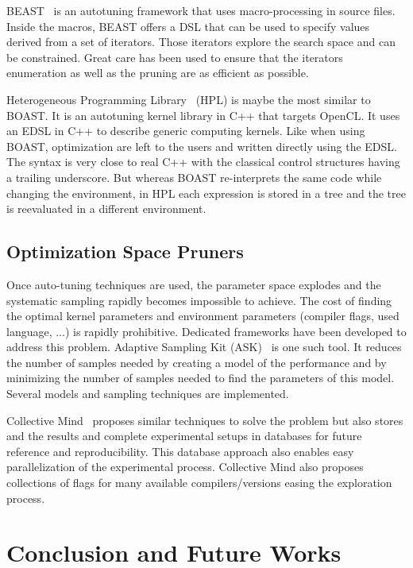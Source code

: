 \documentclass{IEEEtran}
\begin{document}
BEAST~\cite{CPE:CPE3516} is an autotuning framework that uses macro-processing
in source files. Inside the macros, BEAST offers a DSL that can be used to
specify values derived from a set of iterators. Those iterators explore the
search space and can be constrained. Great care has been used to ensure that
the iterators enumeration as well as the pruning are as efficient as possible.

Heterogeneous Programming Library~\cite{vinas2013exploiting} (HPL) is maybe
the most similar to BOAST. It is an autotuning kernel library in C++ that targets
OpenCL. It uses an EDSL in C++ to describe generic computing kernels. Like when
using BOAST, optimization are left to the users and written directly using the
EDSL. The syntax is very close to real C++ with the classical control
structures having a trailing underscore. But whereas BOAST re-interprets the
same code while changing the environment, in HPL each expression is stored in a
tree and the tree is reevaluated in a different environment.

\subsection{Optimization Space Pruners}

Once auto-tuning techniques are used, the parameter space explodes and the
systematic sampling rapidly becomes impossible to achieve. The cost of finding
the optimal kernel parameters and environment parameters (compiler flags, used
language, ...) is rapidly prohibitive. Dedicated frameworks have been developed
to address this problem. Adaptive Sampling Kit (ASK)~\cite{castro2013adaptive}
is one such tool. It reduces the number of samples needed by creating a model of
the performance and by minimizing the number of samples needed to find the
parameters of this model. Several models and sampling techniques are
implemented.

Collective Mind~\cite{fursin:hal-01054763} proposes similar techniques to
solve the problem but also stores and the results and complete experimental
setups in databases for future reference and reproducibility. This database
approach also enables easy parallelization of the experimental process.
Collective Mind also proposes collections of flags for many available
compilers/versions easing the exploration process.

\section{Conclusion and Future Works}
\end{document}
